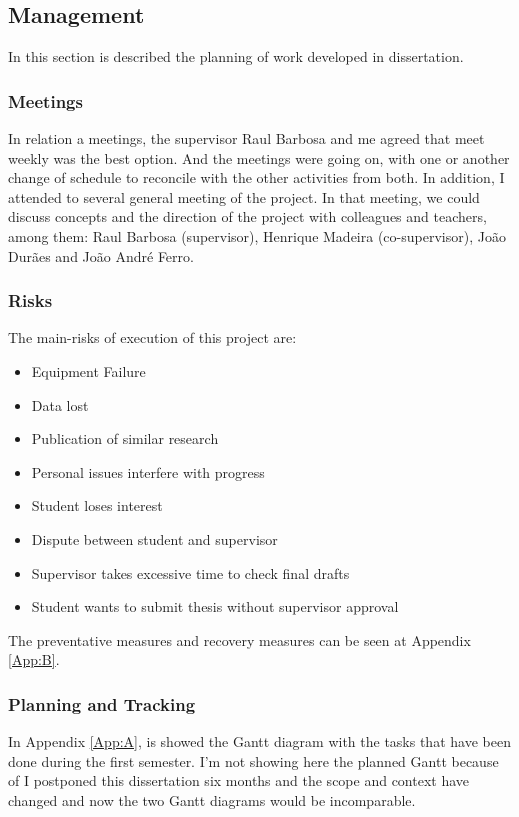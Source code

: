 \subsection{Management}

In this section is described the planning of work developed in dissertation.

\subsubsection{Meetings}
In relation a meetings, the supervisor Raul Barbosa and me agreed that meet weekly was the best option. And the meetings were going on, with one or another change of schedule to reconcile with the other activities from both. In addition, I attended to several general meeting of the project. In that meeting, we could discuss concepts and the direction of the project with colleagues and teachers, among them: Raul Barbosa (supervisor), Henrique Madeira (co-supervisor), João Durães and João André Ferro.

\subsubsection{Risks}

The main-risks of execution of this project are:

\begin{itemize}
	\item Equipment Failure
	\item Data lost
	\item Publication of similar research
	\item Personal issues interfere with progress
	\item Student loses interest
	\item Dispute between student and supervisor
	\item Supervisor takes excessive time to check final drafts
	\item Student wants to submit thesis without supervisor approval
\end{itemize}


The preventative measures and recovery measures can be seen at Appendix \ref{App:B}.

\subsubsection{Planning and Tracking}
In Appendix \ref{App:A}, is showed the Gantt diagram with the tasks that have been done during the first semester.
I'm not showing here the planned Gantt because of I postponed this dissertation six months and the scope and context have changed and now the two Gantt diagrams would be incomparable.



